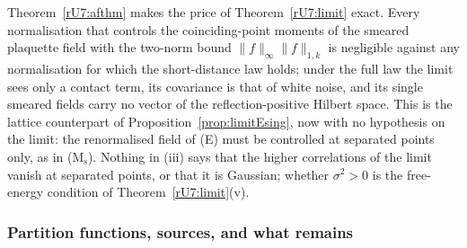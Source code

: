 \begin{remark}\label{rU7:afremark}
Theorem~\ref{rU7:afthm} makes the price of Theorem~\ref{rU7:limit} exact. Every
normalisation that controls the coinciding-point moments of the smeared
plaquette field with the two-norm bound $\|f\|_\infty\|f\|_{1,k}$ is
negligible against any normalisation for which the short-distance law holds;
under the full law the limit sees only a contact term, its covariance is
that of white noise, and its single smeared fields carry no vector of the
reflection-positive Hilbert space. This is the lattice counterpart of
Proposition~\ref{prop:limitEsing}, now with no hypothesis on the limit: the
renormalised field of (E) must be controlled at separated points only, as
in (M$_{\mathrm s}$). Nothing in (iii) says that the higher correlations of the
limit vanish at separated points, or that it is Gaussian; whether
$\sigma^2>0$ is the free-energy condition of Theorem~\ref{rU7:limit}(v).
\end{remark}
\subsubsection{Partition functions, sources, and what remains}
\label{rU7:balaban}

